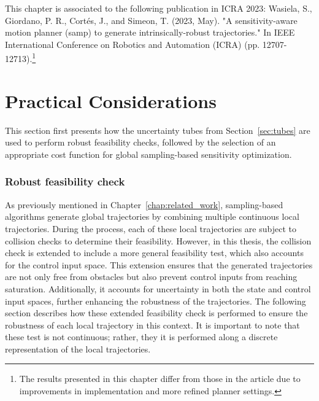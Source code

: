 This chapter is associated to the following publication in ICRA 2023: Wasiela, S., Giordano, P. R., Cortés, J., and Simeon, T. (2023, May). "A sensitivity-aware motion planner (samp) to generate intrinsically-robust trajectories." In IEEE International Conference on Robotics and Automation (ICRA) (pp. 12707-12713).\footnote{The results presented in this chapter differ from those in the article due to improvements in implementation and more refined planner settings.}

\section{Practical Considerations}\label{sec:metrics}

This section first presents how the uncertainty tubes from Section~\ref{sec:tubes} are used to perform robust feasibility checks, followed by the selection of an appropriate cost function for global sampling-based sensitivity optimization.

\subsubsection{Robust feasibility check}\label{sec:robust_CC}

As previously mentioned in Chapter~\ref{chap:related_work}, sampling-based algorithms generate global trajectories by combining multiple continuous local trajectories.
During the process, each of these local trajectories are subject to collision checks to determine their feasibility.
However, in this thesis, the collision check is extended to include a more general feasibility test, which also accounts for the control input space. 
This extension ensures that the generated trajectories are not only free from obstacles but also prevent control inputs from reaching saturation. 
Additionally, it accounts for uncertainty in both the state and control input spaces, further enhancing the robustness of the trajectories.
The following section describes how these extended feasibility check is performed to ensure the robustness of each local trajectory in this context.
It is important to note that these test is not continuous; rather, they it is performed along a discrete representation of the local trajectories.

